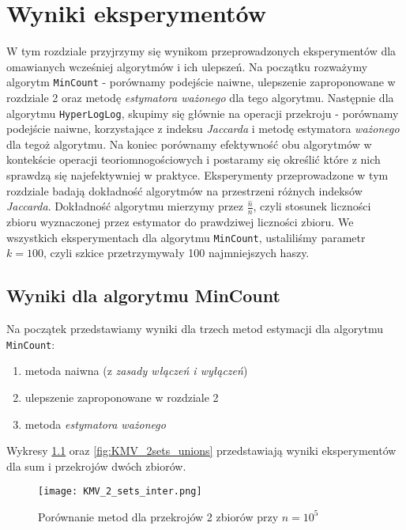 \chapter{Wyniki eksperymentów}
\thispagestyle{chapterBeginStyle}

W tym rozdziale przyjrzymy się wynikom przeprowadzonych eksperymentów dla omawianych wcześniej algorytmów i ich ulepszeń. Na początku rozważymy algorytm \texttt{MinCount} - porównamy podejście naiwne, ulepszenie zaproponowane w rozdziale 2 oraz metodę \textit{estymatora ważonego} dla tego algorytmu. Następnie dla algorytmu \texttt{HyperLogLog}, skupimy się głównie na operacji przekroju - porównamy podejście naiwne, korzystające z indeksu \textit{Jaccarda} i metodę estymatora \textit{ważonego} dla tegoż algorytmu. Na koniec porównamy efektywność obu algorytmów w kontekście operacji teoriomnogościowych i postaramy się określić które z nich sprawdzą się najefektywniej w praktyce. Eksperymenty przeprowadzone w tym rozdziale badają dokładność algorytmów na przestrzeni różnych indeksów \textit{Jaccarda}. Dokładność algorytmu mierzymy przez $\frac{\hat{n}}{n}$, czyli stosunek liczności zbioru wyznaczonej przez estymator do prawdziwej liczności zbioru. We wszystkich eksperymentach dla algorytmu \texttt{MinCount}, ustaliliśmy parametr $k = 100$, czyli szkice przetrzymywały 100 najmniejszych haszy.

\section{Wyniki dla algorytmu MinCount}
Na początek przedstawiamy wyniki dla trzech metod estymacji dla algorytmu \texttt{MinCount}:
\begin{enumerate}
	\item metoda naiwna (z \textit{zasady włączeń i wyłączeń})
	\item ulepszenie zaproponowane w rozdziale 2
	\item metoda \textit{estymatora ważonego}
\end{enumerate}

Wykresy \ref{fig:KMV_2sets_inter} oraz \ref{fig:KMV_2sets_unions} przedstawiają wyniki eksperymentów dla sum i przekrojów dwóch zbiorów.

\begin{figure}[h!]
    \texttt{[image: KMV\_2\_sets\_inter.png]}
    \centering
    \caption{Porównanie metod dla przekrojów 2 zbiorów przy $n=10^5$}
    \label{fig:KMV_2sets_inter}
\end{figure}

